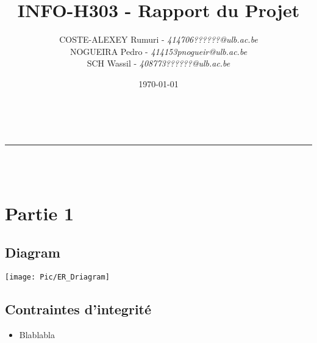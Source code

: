 \documentclass[12pt,a4paper]{article}
\makeatletter
\newcommand{\linha}{\rule{\linewidth}{0.4mm}}
\renewcommand{\maketitle}{
\begin{center}
\vspace{2ex}
{\huge\textsc{\@title}}
\vspace{1ex}\\
\linha\\
\@author\\\@date
\vspace{4ex}
\end{center}
}
\makeatother
\begin{document}
	\title{INFO-H303 - Rapport du Projet}
	\author{
		COSTE-ALEXEY Rumuri - \emph{414706}\hfill\textit{??????@ulb.ac.be}\\
		NOGUEIRA Pedro - \emph{414153}\hfill\textit{pnogueir@ulb.ac.be}\\
		SCH Wassil - \emph{408773}\hfill\textit{??????@ulb.ac.be}
	}
	\date{\today}
	\maketitle


	\section*{Partie 1}
		\subsection*{Diagram}
			\begin{center}
				\texttt{[image: Pic/ER\_Driagram]}
			\end{center}
		\subsection*{Contraintes d'integrité}
			\begin{itemize}
				\item Blablabla
			\end{itemize}
\end{document}
